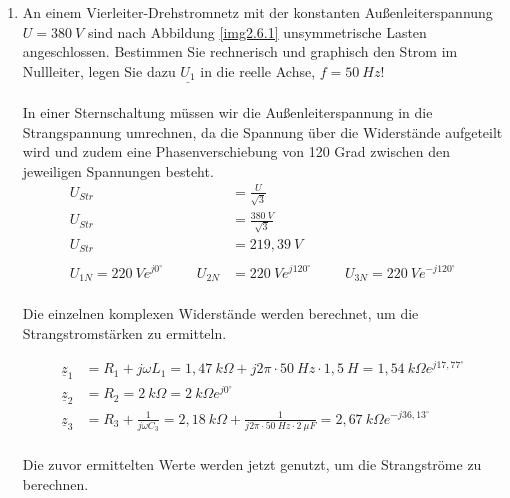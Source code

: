 \begin{enumerate}[label=\alph*)]
  \item\label{aufgabe2.5} An einem Vierleiter-Drehstromnetz mit der konstanten Außenleiterspannung $U = 380\ V$ sind nach Abbildung \ref{img2.6.1} unsymmetrische Lasten angeschlossen. Bestimmen Sie rechnerisch und graphisch den Strom im Nullleiter, legen Sie dazu $\underline{U_1}$ in die reelle Achse, $f = 50\ Hz$!
	\\ \ \\
	In einer Sternschaltung müssen wir die Außenleiterspannung in die Strangspannung umrechnen, da die Spannung über die Widerstände aufgeteilt wird und zudem eine Phasenverschiebung von 120 Grad zwischen den jeweiligen Spannungen besteht.\\
	\begin{align*}
		U_{Str} &= \frac{U}{\sqrt{3}} \\
		U_{Str} &= \frac{380\ V}{\sqrt{3}}\\
		U_{Str} &= 219,39\ V\\ \ \\
		U_{1N}=220\ Ve^{j0^\circ} \hspace{1cm}
		U_{2N}&=220\ Ve^{j120^\circ} \hspace{1cm}
		U_{3N}=220\ Ve^{-j120^\circ}\\
	\end{align*}
		
	Die einzelnen komplexen Widerstände werden berechnet, um die Strangstromstärken zu ermitteln.
	
	\begin{align*}
		\underline{z}_{1} &= R_{1} + j\omega L_{1} = 1,47\ k\Omega + j2\pi\cdot 50\ Hz\cdot1,5\ H = 1,54\ k\Omega e^{j17,77^\circ}\\
		\underline{z}_{2} &= R_{2} = 2\ k\Omega = 2\ k\Omega e^{j0^\circ}\\
		\underline{z}_{3} &= R_{3} + \frac{1}{j\omega C_{3}} = 2,18\ k\Omega + \frac{1}{j2\pi\cdot 50\ Hz\cdot2\ \mu F} = 2,67\ k\Omega e^{-j36,13^\circ}\\
	\end{align*}
	
	Die zuvor ermittelten Werte werden jetzt genutzt, um die Strangströme zu berechnen.
	

\end{enumerate}
